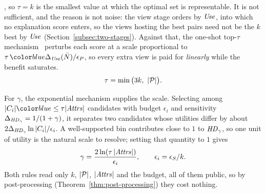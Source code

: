 , so $\tau=k$ is the smallest value at which the optimal set is representable.
It is not sufficient, and the reason is not noise: the view stage orders by $\mathit{Use}$, into which no explanation score enters, so the views hosting the best pairs need not be the $k$ best by $\mathit{Use}$ (Section~\ref{subsec:two-stages}).
Against that, the one-shot top-$\tau$ mechanism~\cite{DurfeeRogers19} perturbs each score at a scale proportional to $\tau\,\added{\Delta_{\Use}(\bar N)}/\epsilon_P$, so every extra view is paid for \emph{linearly} while the benefit saturates.
\begin{equation}
\tau=\min\big(3k,\ |\mathcal{P}|\big).
\label{eq:tau-rule}
\end{equation}

For $\gamma$, the exponential mechanism supplies the scale.
Selecting among $|C_i|\added{\le}\tau|\Attrs|$ candidates with budget $\epsilon_i$ and sensitivity $\Delta_{\mathit{HD}_\gamma}=1/(1+\gamma)$, it separates two candidates whose utilities differ by about $2\Delta_{\mathit{HD}_\gamma}\ln|C_i|/\epsilon_i$.
A well-supported bin contributes close to $1$ to $\mathit{HD}_\gamma$, so one unit of utility is the natural scale to resolve; setting that quantity to  $1$ gives
\begin{equation}
\gamma=\frac{2\ln(\tau\,|\mathit{Attrs}|)}{\epsilon_i},\qquad \epsilon_i=\epsilon_S/k .
\label{eq:gamma-rule}
\end{equation}
Both rules read only $k$, $|\mathcal{P}|$, $|\mathit{Attrs}|$ and the budget, all of them public, so by post-processing (Theorem~\ref{thm:post-processing}) they cost nothing.

